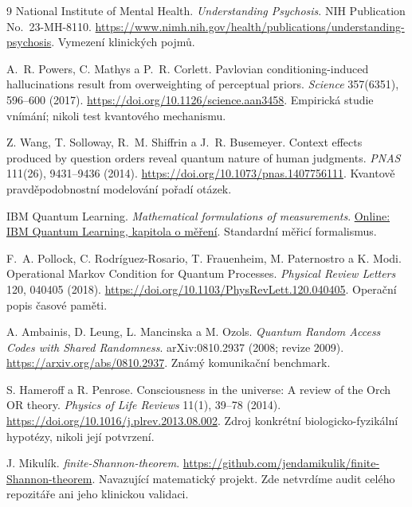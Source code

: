 \documentclass[11pt,a4paper]{article}
\begin{document}
\begin{thebibliography}{9}
National Institute of Mental Health.
\emph{Understanding Psychosis}. NIH Publication No.~23-MH-8110.
\url{https://www.nimh.nih.gov/health/publications/understanding-psychosis}.
Vymezení klinických pojmů.

A.~R. Powers, C. Mathys a P.~R. Corlett.
Pavlovian conditioning-induced hallucinations result from overweighting of perceptual priors.
\emph{Science} 357(6351), 596--600 (2017).
\url{https://doi.org/10.1126/science.aan3458}.
Empirická studie vnímání; nikoli test kvantového mechanismu.

Z. Wang, T. Solloway, R.~M. Shiffrin a J.~R. Busemeyer.
Context effects produced by question orders reveal quantum nature of human judgments.
\emph{PNAS} 111(26), 9431--9436 (2014).
\url{https://doi.org/10.1073/pnas.1407756111}.
Kvantově pravděpodobnostní modelování pořadí otázek.

IBM Quantum Learning.
\emph{Mathematical formulations of measurements}.
\href{https://quantum.cloud.ibm.com/learning/en/courses/general-formulation-of-quantum-information/general-measurements/formulations-of-measurements}{Online: IBM Quantum Learning, kapitola o měření}.
Standardní měřicí formalismus.

F.~A. Pollock, C. Rodríguez-Rosario, T. Frauenheim, M. Paternostro a K. Modi.
Operational Markov Condition for Quantum Processes.
\emph{Physical Review Letters} 120, 040405 (2018).
\url{https://doi.org/10.1103/PhysRevLett.120.040405}.
Operační popis časové paměti.

A. Ambainis, D. Leung, L. Mancinska a M. Ozols.
\emph{Quantum Random Access Codes with Shared Randomness}.
arXiv:0810.2937 (2008; revize 2009).
\url{https://arxiv.org/abs/0810.2937}.
Známý komunikační benchmark.

S. Hameroff a R. Penrose.
Consciousness in the universe: A review of the Orch OR theory.
\emph{Physics of Life Reviews} 11(1), 39--78 (2014).
\url{https://doi.org/10.1016/j.plrev.2013.08.002}.
Zdroj konkrétní biologicko-fyzikální hypotézy, nikoli její potvrzení.

J. Mikulík.
\emph{finite-Shannon-theorem}.
\url{https://github.com/jendamikulik/finite-Shannon-theorem}.
Navazující matematický projekt. Zde netvrdíme audit celého repozitáře ani jeho klinickou validaci.
\end{thebibliography}
\end{document}
